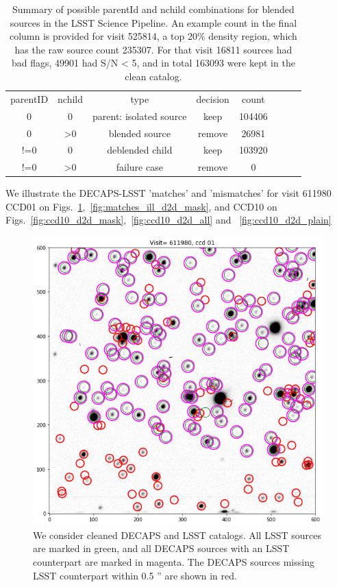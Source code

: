 \documentclass[DM,lsstdraft,toc,usenatbib]{lsstdoc}
\begin{document}
\begin{table}
\centering
\caption{ Summary of possible parentId and nchild combinations for blended sources in the LSST Science Pipeline. An example count in the final column is provided for visit 525814, a top 20\% density region, which has the raw source count 235307. For that visit  16811 sources had bad flags, 49901  had S/N < 5, and in total 163093 were kept in the clean catalog.  }
\label{tab:lsst_deblend}
\begin{tabular}{cccccccc}
parentID & nchild & type  & decision &  count \\
0 & 0 & parent: isolated source & keep & 104406 \\
0 & >0 & blended source & remove & 26981 \\
!=0 & 0 & deblended child & keep  &103920\\
!=0 & >0 & failure case & remove & 0 \\
\hline
\end{tabular}
\end{table}


We illustrate the DECAPS-LSST 'matches' and 'mismatches' for visit 611980 CCD01 on Figs.~\ref{fig:matches_ill_d2d},~\ref{fig:matches_ill_d2d_mask}, and CCD10 on Figs.~\ref{fig:ccd10_d2d_mask},~\ref{fig:ccd10_d2d_all} and ~\ref{fig:ccd10_d2d_plain}


\begin{figure}
\begin{centering}
\includegraphics[width=0.7\columnwidth]{figs/08_visit_611980_ccd0110-24d2d_all.png}
\caption{We consider cleaned DECAPS and LSST catalogs. All LSST sources are marked in green, and all DECAPS sources with an LSST counterpart are marked in magenta. The DECAPS sources missing LSST counterpart within 0.5 '' are shown in red. }
\label{fig:matches_ill_d2d}
\end{centering}
\end{figure} 
\end{document}
